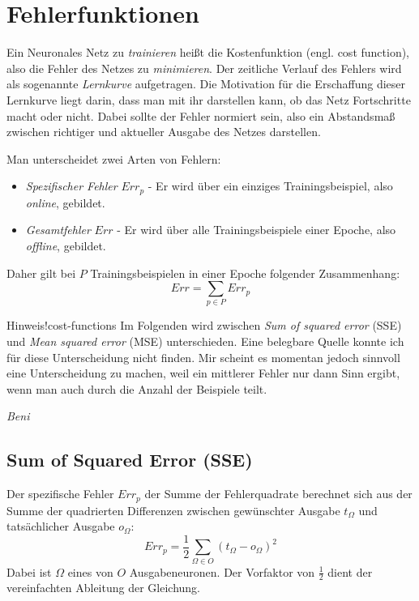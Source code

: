 \section*{Fehlerfunktionen}
Ein Neuronales Netz zu \emph{trainieren} heißt die Kostenfunktion (engl. cost function), also die Fehler des Netzes zu \emph{minimieren}.
Der zeitliche Verlauf des Fehlers wird als sogenannte \emph{Lernkurve} aufgetragen. Die Motivation für die Erschaffung dieser Lernkurve liegt darin, dass man mit ihr darstellen kann, ob das Netz Fortschritte macht oder nicht. Dabei sollte der Fehler normiert sein, also ein Abstandsmaß zwischen richtiger und aktueller Ausgabe des Netzes darstellen.

Man unterscheidet zwei Arten von Fehlern:
\begin{itemize}
	\item \emph{Spezifischer Fehler} $Err_p$ - Er wird über ein einziges Trainingsbeispiel, also \emph{online}, gebildet.
	\item \emph{Gesamtfehler} $Err$ - Er wird über alle Trainingsbeispiele einer Epoche, also \emph{offline}, gebildet.
\end{itemize}
Daher gilt bei $P$ Trainingsbeispielen in einer Epoche folgender Zusammenhang:
\[
	Err = \sum_{p \in P} Err_p
\]

\begin{hint}{Hinweis!}{cost-functions}
	Im Folgenden wird zwischen \emph{Sum of squared error} (SSE) und \emph{Mean squared error} (MSE) unterschieden.
	Eine belegbare Quelle konnte ich für diese Unterscheidung nicht finden. Mir scheint es momentan jedoch sinnvoll eine Unterscheidung zu machen, weil ein mittlerer Fehler nur dann Sinn ergibt, wenn man auch durch die Anzahl der Beispiele teilt.

	\begin{flushright}\textit{Beni}\end{flushright}
\end{hint}

\subsection*{Sum of Squared Error (SSE)}
Der spezifische Fehler $Err_p$ der Summe der Fehlerquadrate berechnet sich aus der Summe der quadrierten Differenzen zwischen gewünschter Ausgabe $t_{\Omega}$ und tatsächlicher Ausgabe $o_{\Omega}$:
\[
	Err_p = \frac{1}{2} \sum_{\Omega \in O} ( t_{\Omega} - o_{\Omega})^2
\]
Dabei ist $\Omega$ eines von $O$ Ausgabeneuronen. Der Vorfaktor von $\frac{1}{2}$ dient der vereinfachten Ableitung der Gleichung.

